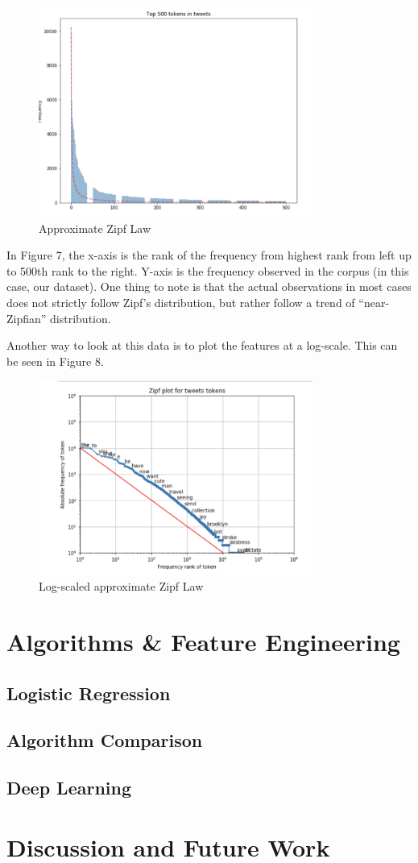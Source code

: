 \documentclass{article}
\begin{document}
	\begin{figure}[h]
		\label{Figure 6}
		\caption{Approximate Zipf Law}
		\includegraphics[width=9cm]{zipf.png}
		\centering
	\end{figure}
	
	
	In Figure 7, the x-axis is the rank of the frequency from highest rank from left up to 500th rank to the right. Y-axis is the frequency observed in the corpus (in this case, our dataset). One thing to note is that the actual observations in most cases does not strictly follow Zipf’s distribution, but rather follow a trend of “near-Zipfian” distribution.
	
	Another way to look at this data is to plot the features at a log-scale. This can be seen in Figure 8.
	
	\begin{figure}[h]
		\label{Figure 6}
		\caption{Log-scaled approximate Zipf Law}
		\includegraphics[width=9cm]{logzipf.png}
		\centering
	\end{figure}
	
	

	
	\section{Algorithms \& Feature Engineering}
	\subsection{Logistic Regression}
	\subsection{Algorithm Comparison}
	\subsection{Deep Learning}
	\section{Discussion and Future Work}
\end{document}
